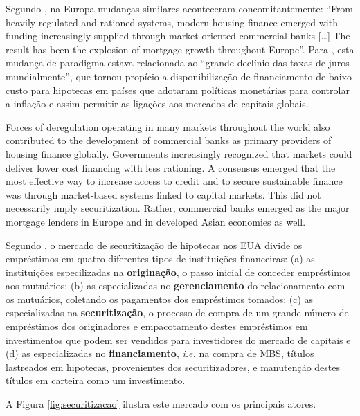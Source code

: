 \documentclass[
	12pt,				%
	oneside,			%
	a4paper,			%
	chapter=TITLE,		%
	section=TITLE,		%
	english,			%
	brazil				%
	]{abntex2}
\begin{document}
\begin{refsection}
Segundo \textcite[p.~26]{green}, na Europa mudanças similares aconteceram
concomitantemente: ``From heavily regulated and rationed systems, modern housing
ﬁnance emerged with funding increasingly supplied through market-oriented
commercial banks {[}\ldots{]} The result has been the explosion of mortgage growth
throughout Europe''. Para \textcite[p.~26-27]{green}, esta mudança de paradigma estava
relacionada ao ``grande declínio das taxas de juros mundialmente'', que
tornou propício a disponibilização de financiamento de baixo custo para
hipotecas em países que adotaram políticas monetárias para controlar
a inflação e assim permitir as ligações aos mercados de capitais globais.
\begin{citacao}
Forces of deregulation operating in many markets throughout the world also 
contributed to the development of commercial banks as primary providers of 
housing ﬁnance globally. Governments increasingly recognized that markets could 
deliver lower cost ﬁnancing with less rationing. A consensus emerged that the 
most effective way to increase access to credit and to secure sustainable ﬁnance 
was through market-based systems linked to capital markets. This did not 
necessarily imply securitization. Rather, commercial banks emerged as the major 
mortgage lenders in Europe and in developed Asian economies as well.  
\cite[p. 26]{green}
\end{citacao}
Segundo \textcite[p.~214-215]{simkovic}, o mercado de securitização de hipotecas nos EUA
divide os empréstimos em quatro diferentes tipos de instituições financeiras:
(a) as instituições especilizadas na \textbf{originação}, o passo inicial de conceder
empréstimos aos mutuários; (b) as especializadas no \textbf{gerenciamento} do
relacionamento com os mutuários, coletando os pagamentos dos empréstimos
tomados; (c) as especializadas na \textbf{securitização}, o processo de compra de um
grande número de empréstimos dos originadores e empacotamento destes empréstimos
em investimentos que podem ser vendidos para investidores do mercado de capitais
e (d) as especializadas no \textbf{financiamento}, \emph{i.e.} na compra de \gls{MBS},
títulos lastreados em hipotecas, provenientes dos securitizadores, e manutenção
destes títulos em carteira como um investimento.

A Figura \ref{fig:securitizacao} ilustra este mercado com os principais atores.
\begin{figure}[H]


\end{figure}
\end{refsection}
\end{document}
